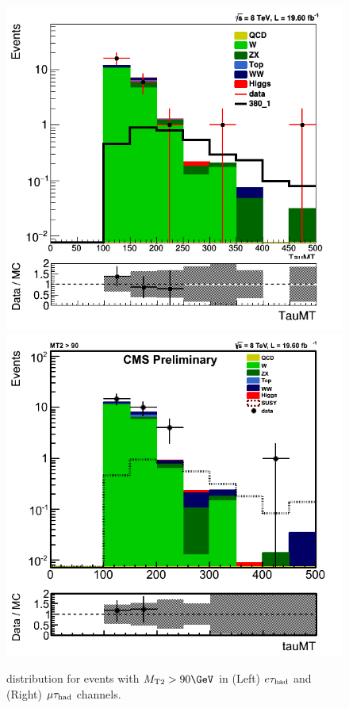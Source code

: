 \begin{figure}[!Hhtb]
\centering
\includegraphics[angle=0,scale=0.35]{SelectionEleTau/TauMT.png}
\includegraphics[angle=0,scale=0.35]{SelectionMuTau/tauMT_Ratio_MT2gt90_unBlinded.png}
\caption{\tauMT distribution for events with $\mttwo>90\GeV$ in (Left) $e\tau_{\rm had}$ and (Right) $\mu\tau_{\rm had}$ channels.}
\label{fig:taumtleptontau}
\end{figure}

